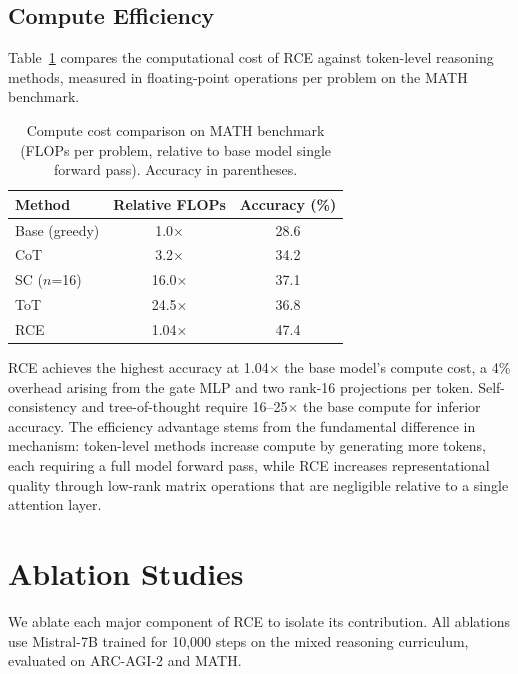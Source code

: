 \documentclass[11pt]{article}
\begin{document}
\subsection{Compute Efficiency}

Table~\ref{tab:compute} compares the computational cost of RCE against token-level reasoning methods, measured in floating-point operations per problem on the MATH benchmark.

\begin{table}[t]
\centering
\caption{Compute cost comparison on MATH benchmark (FLOPs per problem, relative to base model single forward pass). Accuracy in parentheses.}
\label{tab:compute}
\small
\begin{tabular}{lcc}
\toprule
Method & Relative FLOPs & Accuracy (\%) \\
\midrule
Base (greedy) & 1.0$\times$ & 28.6 \\
CoT & 3.2$\times$ & 34.2 \\
SC ($n$=16) & 16.0$\times$ & 37.1 \\
ToT & 24.5$\times$ & 36.8 \\
RCE & 1.04$\times$ & 47.4 \\
\bottomrule
\end{tabular}
\end{table}

RCE achieves the highest accuracy at 1.04$\times$ the base model's compute cost, a 4\% overhead arising from the gate MLP and two rank-16 projections per token. Self-consistency and tree-of-thought require 16--25$\times$ the base compute for inferior accuracy. The efficiency advantage stems from the fundamental difference in mechanism: token-level methods increase compute by generating more tokens, each requiring a full model forward pass, while RCE increases representational quality through low-rank matrix operations that are negligible relative to a single attention layer.

\section{Ablation Studies}

We ablate each major component of RCE to isolate its contribution. All ablations use Mistral-7B trained for 10,000 steps on the mixed reasoning curriculum, evaluated on ARC-AGI-2 and MATH.
\end{document}
